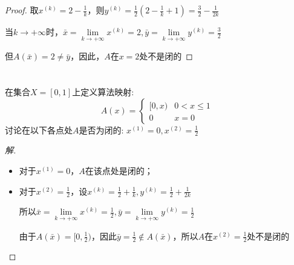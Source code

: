 \documentclass[a4paper]{article}
\begin{document}
\begin{proof}
	取$x^{(k)}=2-\frac{1}{k}$，则$y^{(k)}=\frac{1}{2}(2-\frac{1}{k}+1)=\frac{3}{2}-\frac{1}{2k}$
	
	当$k\to +\infty$时，$\bar{x}=\lim\limits_{k\to +\infty}x^{(k)}=2,\bar{y}=\lim\limits_{k\to +\infty}y^{(k)}=\frac{3}{2}$
	
	但$A(\bar{x})=2\neq \bar{y}$，因此，$A$在$x=2$处不是闭的
\end{proof}

\section{}
在集合$X=[0,1]$上定义算法映射:
\begin{equation}
A(x)=\left\{
\begin{array}{cc}
[0,x) & 0<x\le 1 \\
0 & x=0
\end{array}
\right.
\end{equation}
讨论在以下各点处$A$是否为闭的: $x^{(1)}=0,x^{(2)}=\frac{1}{2}$
\begin{proof}[解]
	
	
	\begin{itemize}
		\item 对于$x^{(1)}=0$，$A$在该点处是闭的；
		\item 对于$x^{(2)}=\frac{1}{2}$，设$x^{(k)}=\frac{1}{2}+\frac{1}{k}, y^{(k)}=\frac{1}{2}+\frac{1}{2k}$
		
		所以$\bar{x}=\lim\limits_{k\to +\infty}x^{(k)}=\frac{1}{2},\bar{y}=\lim\limits_{k\to +\infty}y^{(k)}=\frac{1}{2}$
		
		由于$A(\bar{x})=[0,\frac{1}{2})$，因此$\bar{y}=\frac{1}{2}\notin A(\bar{x})$，所以$A$在$x^{(2)}=\frac{1}{2}$处不是闭的
	\end{itemize}

\end{proof}
\end{document}
